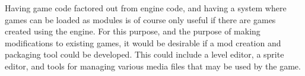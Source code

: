  	Having game code factored out from engine code, and having a system where games can be loaded as modules is of course only useful if there are games created using the engine. For this purpose, and the purpose of making modifications to existing games, it would be desirable if a mod creation and packaging tool could be developed.
 	This could include a level editor, a sprite editor, and tools for managing various media files that may be used by the game.
	
